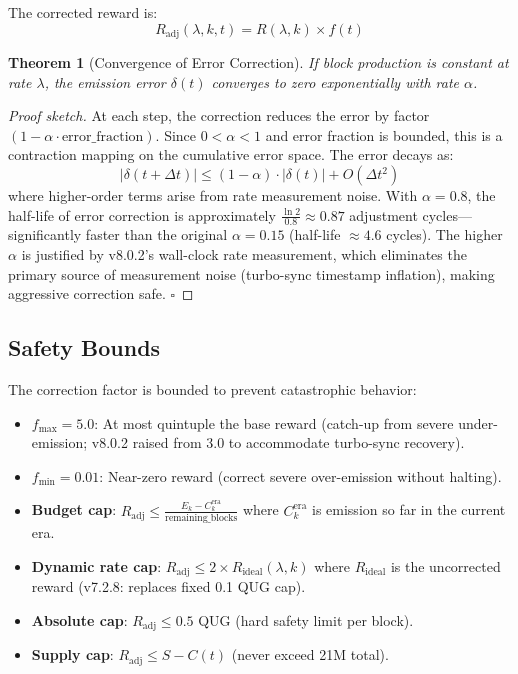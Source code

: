 \documentclass[11pt,a4paper]{article}
\newtheorem{theorem}{Theorem}[section]
\begin{document}
The corrected reward is:
\begin{equation}
    R_{\text{adj}}(\lambda, k, t) = R(\lambda, k) \times f(t)
\end{equation}

\begin{theorem}[Convergence of Error Correction]
If block production is constant at rate $\lambda$, the emission error $\delta(t)$ converges to zero exponentially with rate $\alpha$.
\end{theorem}

\begin{proof}[Proof sketch]
At each step, the correction reduces the error by factor $(1 - \alpha \cdot \text{error\_fraction})$. Since $0 < \alpha < 1$ and error fraction is bounded, this is a contraction mapping on the cumulative error space. The error decays as:
\[
|\delta(t + \Delta t)| \leq (1 - \alpha) \cdot |\delta(t)| + O(\Delta t^2)
\]
where higher-order terms arise from rate measurement noise. With $\alpha = 0.8$, the half-life of error correction is approximately $\frac{\ln 2}{0.8} \approx 0.87$ adjustment cycles---significantly faster than the original $\alpha = 0.15$ (half-life $\approx 4.6$ cycles). The higher $\alpha$ is justified by v8.0.2's wall-clock rate measurement, which eliminates the primary source of measurement noise (turbo-sync timestamp inflation), making aggressive correction safe. $\square$
\end{proof}

\subsection{Safety Bounds}

The correction factor is bounded to prevent catastrophic behavior:

\begin{itemize}
    \item $f_{\max} = 5.0$: At most quintuple the base reward (catch-up from severe under-emission; v8.0.2 raised from 3.0 to accommodate turbo-sync recovery).
    \item $f_{\min} = 0.01$: Near-zero reward (correct severe over-emission without halting).
    \item \textbf{Budget cap}: $R_{\text{adj}} \leq \frac{E_k - C_k^{\text{era}}}{\text{remaining\_blocks}}$ where $C_k^{\text{era}}$ is emission so far in the current era.
    \item \textbf{Dynamic rate cap}: $R_{\text{adj}} \leq 2 \times R_{\text{ideal}}(\lambda, k)$ where $R_{\text{ideal}}$ is the uncorrected reward (v7.2.8: replaces fixed 0.1 QUG cap).
    \item \textbf{Absolute cap}: $R_{\text{adj}} \leq 0.5$ QUG (hard safety limit per block).
    \item \textbf{Supply cap}: $R_{\text{adj}} \leq S - C(t)$ (never exceed 21M total).
\end{itemize}
\end{document}
